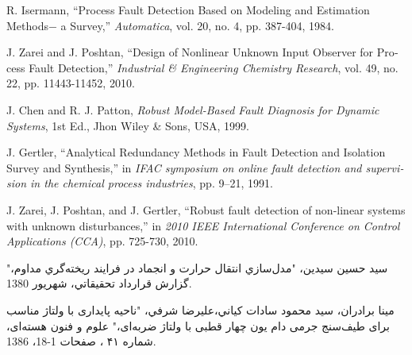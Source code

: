 
\begin{thebibliography}{99}
\begin{latin}
\begin{LTRbibitems}
{R. Isermann, “Process Fault Detection Based on Modeling and Estimation Methods− a Survey,” \emph{Automatica}, vol. 20, no. 4, pp. 387-404, 1984.}

{J. Zarei and J. Poshtan, “Design of Nonlinear Unknown Input Observer for Process Fault Detection,” \emph{Industrial \& Engineering Chemistry Research}, vol. 49, no. 22, pp. 11443-11452, 2010.}

{J. Chen and R. J. Patton, \emph{Robust Model-Based Fault Diagnosis for Dynamic Systems}, 1st Ed., Jhon Wiley \& Sons, USA, 1999.}

{J. Gertler, “Analytical Redundancy Methods in Fault Detection and Isolation Survey and Synthesis,” in \emph{IFAC symposium on online fault detection and supervision in the chemical process industries}, pp. 9–21, 1991.}

{J. Zarei, J. Poshtan,  and J. Gertler, “Robust fault detection of non-linear systems with unknown disturbances,” in \emph{2010 IEEE International Conference on Control Applications (CCA)}, pp. 725-730, 2010.}
\end{LTRbibitems}
\end{latin}

{سيد حسين سيدين، "مدل‌سازي انتقال حرارت و انجماد در فرايند ريخته‌گري مداوم،" گزارش قرارداد تحقيقاتي، شهريور 1380.}

{مينا برادران، سيد محمود سادات كياني،عليرضا شرفي، "ناحيه پايداری با ولتاژ  مناسب برای طيف‌سنج جرمی دام يون چهار قطبی  با ولتاژ ضربه‌ای،" علوم و فنون هسته‌ای، شماره ۴١ ، صفحات 1-18، 1386}.
\end{thebibliography}